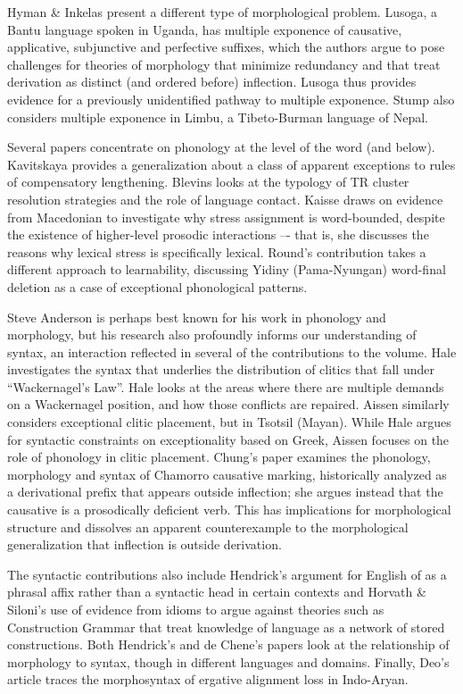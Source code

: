 \begin{refsection}
Hyman \& Inkelas present a different type of morphological problem. Lusoga, a Bantu language spoken in Uganda, has multiple exponence of causative, applicative, subjunctive and perfective suffixes, which the authors argue to pose challenges for theories of morphology that minimize redundancy and that treat derivation as distinct (and ordered before) inflection. Lusoga thus provides evidence for a previously unidentified pathway to multiple exponence. Stump also considers multiple exponence in Limbu, a Tibeto-Burman language of Nepal. 

Several papers concentrate on phonology at the level of the word (and below). Kavitskaya provides a generalization about a class of apparent exceptions to rules of compensatory lengthening. Blevins looks at the typology of TR cluster resolution strategies and the role of language contact. Kaisse draws on evidence from Macedonian to investigate why stress assignment is word-bounded, despite the existence of higher-level prosodic interactions –- that is, she discusses the reasons why lexical stress is specifically lexical. Round’s contribution takes a different approach to learnability, discussing Yidiny (Pama-Nyungan) word-final deletion as a case of exceptional phonological patterns.

Steve Anderson is perhaps best known for his work in phonology and morphology, but his research also profoundly informs our understanding of syntax, an interaction reflected in several of the contributions to the volume. Hale investigates the syntax that underlies the distribution of clitics that fall under “Wackernagel’s Law”. Hale looks at the areas where there are multiple demands on a Wackernagel position, and how those conflicts are repaired. Aissen similarly considers exceptional clitic placement, but in Tsotsil (Mayan). While Hale argues for syntactic constraints on exceptionality based on Greek, Aissen focuses on the role of phonology in clitic placement. Chung’s paper examines the phonology, morphology and syntax of Chamorro causative marking, historically analyzed as a derivational prefix that appears outside inflection; she argues instead that the causative is a prosodically deficient verb. This has implications for morphological structure and dissolves an apparent counterexample to the morphological generalization that inflection is outside derivation. 

The syntactic contributions also include Hendrick’s argument for English of as a phrasal affix rather than a syntactic head in certain contexts and Horvath \& Siloni’s use of evidence from idioms to argue against theories such as Construction Grammar that treat knowledge of language as a network of stored constructions. Both Hendrick’s and de Chene’s papers look at the relationship of morphology to syntax, though in different languages and domains. Finally, Deo’s article traces the morphosyntax of ergative alignment loss in Indo-Aryan.


\end{refsection}
